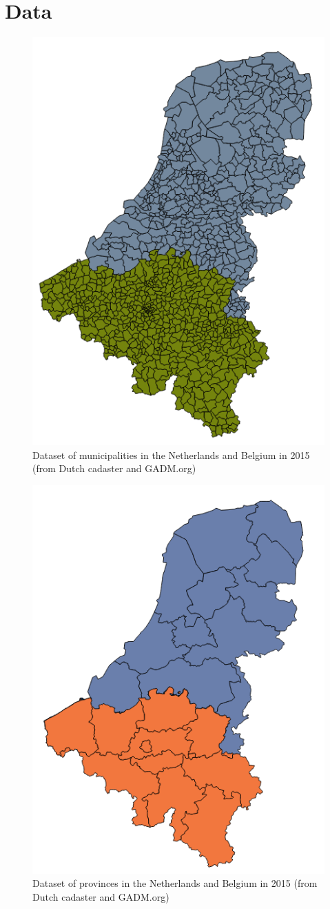 
\chapter{Data}
\label{app:Data}

\begin{figure}[!h]
	\centering
	\includegraphics[width=0.5\linewidth]{figs/Municipalities.png}
	\caption{Dataset of municipalities in the Netherlands and Belgium in 2015 (from Dutch cadaster and GADM.org)}
	\label{fig:municipalities}
\end{figure}

\begin{figure}[!h]
	\centering
	\includegraphics[width=0.5\linewidth]{figs/Provinces.png}
	\caption{Dataset of provinces in the Netherlands and Belgium in 2015 (from Dutch cadaster and GADM.org)}
	\label{fig:provinces}
\end{figure}

